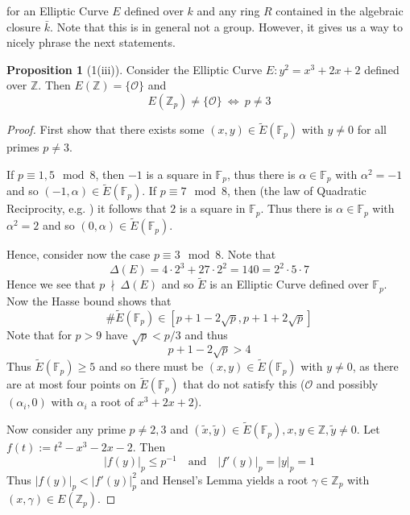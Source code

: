 \documentclass{scrartcl}
\newcommand{\Z}{\mathbb{Z}}
\newcommand{\F}{\mathbb{F}}
\renewcommand{\O}{\mathcal{O}}
\newcommand{\notdivides}{\ \nmid \ }
\theoremstyle{definition}
\newtheorem{prop}[subsection]{Proposition}
\begin{document}
for an Elliptic Curve $E$ defined over $k$ and any ring $R$ contained in the algebraic closure $\bar{k}$.
Note that this is in general not a group.
However, it gives us a way to nicely phrase the next statements.
\begin{prop}[1(iii)]
    \label{prop:1iii}
    Consider the Elliptic Curve $E: y^2 = x^3 + 2x + 2$ defined over $\Z$.
    Then $E(\Z) = \{ \O \}$ and
    \begin{equation*}
        E(\Z_p) \neq \{ \O \} \ \Leftrightarrow \ p \neq 3
    \end{equation*}
\end{prop}
\begin{proof}
    First show that there exists some $(x, y) \in \tilde{E}(\F_p)$ with $y \neq 0$ for all primes $p \neq 3$.

    If $p \equiv 1, 5 \mod 8$, then $-1$ is a square in $\F_p$, thus there is $\alpha \in \F_p$ with $\alpha^2 = -1$ and so $(-1, \alpha) \in \tilde{E}(\F_p)$.
    If $p \equiv 7 \mod 8$, then (the law of Quadratic Reciprocity, e.g. \cite[Prop. I.8.6]{neukirch}) it follows that $2$ is a square in $\F_p$.
    Thus there is $\alpha \in \F_p$ with $\alpha^2 = 2$ and so $(0, \alpha) \in \tilde{E}(\F_p)$.

    Hence, consider now the case $p \equiv 3 \mod 8$.
    Note that
    \begin{equation*}
        \Delta(E) = 4 \cdot 2^3 + 27 \cdot 2^2 = 140 = 2^2 \cdot 5 \cdot 7
    \end{equation*}
    Hence we see that $p \notdivides \Delta(E)$ and so $\tilde{E}$ is an Elliptic Curve defined over $\F_p$.
    Now the Hasse bound \cite[Thm 1.15]{lecture} shows that
    \begin{equation*}
        \#\tilde{E}(\F_p) \in [p + 1 - 2\sqrt{p}, p + 1 + 2\sqrt{p}]
    \end{equation*}
    Note that for $p > 9$ have $\sqrt{p} < p/3$ and thus
    \begin{equation*}
        p + 1 - 2\sqrt{p} > 4
    \end{equation*}
    Thus $\tilde{E}(\F_p) \geq 5$ and so there must be $(x, y) \in \tilde{E}(\F_p)$ with $y \neq 0$, as there are at most four points on $\tilde{E}(\F_p)$ that do not satisfy this ($\O$ and possibly $(\alpha_i, 0)$ with $\alpha_i$ a root of $x^3 + 2x + 2$).

    Now consider any prime $p \neq 2, 3$ and $(\tilde{x}, \tilde{y}) \in \tilde{E}(\F_p), x, y \in \Z, \tilde{y} \neq 0$.
    Let $f(t) := t^2 - x^3 - 2x - 2$.
    Then
    \begin{equation*}
        |f(y)|_p \leq p^{-1} \quad \text{and} \quad |f'(y)|_p = |y|_p = 1
    \end{equation*}
    Thus $|f(y)|_p < |f'(y)|_p^2$ and Hensel's Lemma yields a root $\gamma \in \Z_p$ with $(x, \gamma) \in E(\Z_p)$.


\end{proof}
\end{document}
